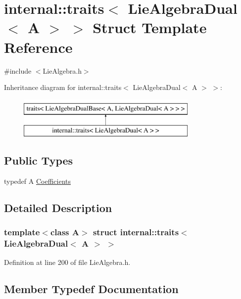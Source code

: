 \hypertarget{structinternal_1_1traits_3_01_lie_algebra_dual_3_01_a_01_4_01_4}{}\section{internal\+:\+:traits$<$ Lie\+Algebra\+Dual$<$ A $>$ $>$ Struct Template Reference}
\label{structinternal_1_1traits_3_01_lie_algebra_dual_3_01_a_01_4_01_4}


{\ttfamily \#include $<$Lie\+Algebra.\+h$>$}

Inheritance diagram for internal\+:\+:traits$<$ Lie\+Algebra\+Dual$<$ A $>$ $>$\+:\begin{figure}[H]
\begin{center}
\leavevmode
\includegraphics[height=2.000000cm]{structinternal_1_1traits_3_01_lie_algebra_dual_3_01_a_01_4_01_4}
\end{center}
\end{figure}
\subsection*{Public Types}
\begin{DoxyCompactItemize}
\item 
typedef A \hyperlink{structinternal_1_1traits_3_01_lie_algebra_dual_3_01_a_01_4_01_4_a1272ac68a65e84810584f5a54eabe4bc}{Coefficients}
\end{DoxyCompactItemize}


\subsection{Detailed Description}
\subsubsection*{template$<$class A$>$\newline
struct internal\+::traits$<$ Lie\+Algebra\+Dual$<$ A $>$ $>$}



Definition at line 200 of file Lie\+Algebra.\+h.



\subsection{Member Typedef Documentation}
\hypertarget{structinternal_1_1traits_3_01_lie_algebra_dual_3_01_a_01_4_01_4_a1272ac68a65e84810584f5a54eabe4bc}{}\label{structinternal_1_1traits_3_01_lie_algebra_dual_3_01_a_01_4_01_4_a1272ac68a65e84810584f5a54eabe4bc} 
